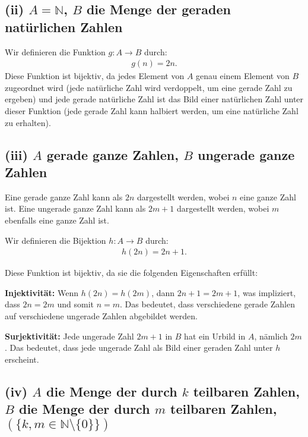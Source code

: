 \documentclass[12pt]{article}
\begin{document}
\subsection*{(ii) \( A = \mathbb{N} \), \( B \) die Menge der geraden natürlichen Zahlen}

Wir definieren die Funktion \( g: A \rightarrow B \) durch:
\begin{align*}
	g(n) = 2n.
\end{align*}
Diese Funktion ist bijektiv, da jedes Element von \( A \) genau einem Element von \( B \) zugeordnet wird (jede natürliche Zahl wird verdoppelt, um eine gerade Zahl zu ergeben) und jede gerade natürliche Zahl ist das Bild einer natürlichen Zahl unter dieser Funktion (jede gerade Zahl kann halbiert werden, um eine natürliche Zahl zu erhalten).

\subsection*{(iii) \( A \) gerade ganze Zahlen, \( B \) ungerade ganze Zahlen}

Eine gerade ganze Zahl kann als \( 2n \) dargestellt werden, wobei \( n \) eine ganze Zahl ist. Eine ungerade ganze Zahl kann als \( 2m + 1 \) dargestellt werden, wobei \( m \) ebenfalls eine ganze Zahl ist.

Wir definieren die Bijektion \( h: A \rightarrow B \) durch:
\begin{align*}
	h(2n) = 2n + 1.
\end{align*}

Diese Funktion ist bijektiv, da sie die folgenden Eigenschaften erfüllt:

\textbf{Injektivität:} Wenn \( h(2n) = h(2m) \), dann \( 2n + 1 = 2m + 1 \), was impliziert, dass \( 2n = 2m \) und somit \( n = m \). Das bedeutet, dass verschiedene gerade Zahlen auf verschiedene ungerade Zahlen abgebildet werden.

\textbf{Surjektivität:} Jede ungerade Zahl \( 2m + 1 \) in \( B \) hat ein Urbild in \( A \), nämlich \( 2m \). Das bedeutet, dass jede ungerade Zahl als Bild einer geraden Zahl unter \( h \) erscheint.

\subsection*{(iv) \( A \) die Menge der durch \(k\) teilbaren Zahlen, \( B \) die Menge der durch \(m\) teilbaren Zahlen, \( (\{k,m \in \mathbb{N} \setminus \{0\}\}) \)}
\end{document}
